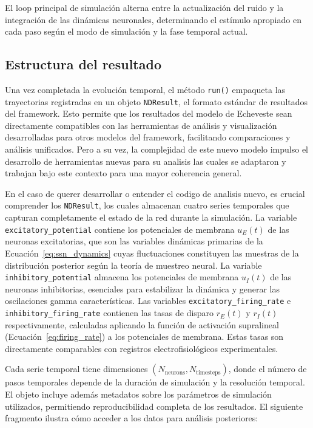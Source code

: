 El loop principal de simulación alterna entre la actualización del ruido y la integración de las dinámicas neuronales, determinando el estímulo apropiado en cada paso según el modo de simulación y la fase temporal actual.

\subsection{Estructura del resultado}
\label{subsec:impl_resultado}

Una vez completada la evolución temporal, el método \texttt{run()} empaqueta las trayectorias registradas en un objeto \texttt{NDResult}, el formato estándar de resultados del framework. Esto permite que los resultados del modelo de Echeveste sean directamente compatibles con las herramientas de análisis y visualización desarrolladas para otros modelos del framework, facilitando comparaciones y análisis unificados. Pero a su vez, la complejidad de este nuevo modelo impulso el desarrollo de herramientas nuevas para su analisis las cuales se adaptaron y trabajan bajo este contexto para una mayor coherencia general.

En el caso de querer desarrollar o entender el codigo de analisis nuevo, es crucial comprender los \texttt{NDResult}, los cuales almacenan cuatro series temporales que capturan completamente el estado de la red durante la simulación. La variable \texttt{excitatory\_potential} contiene los potenciales de membrana $u_E(t)$ de las neuronas excitatorias, que son las variables dinámicas primarias de la Ecuación~\ref{eq:ssn_dynamics} cuyas fluctuaciones constituyen las muestras de la distribución posterior según la teoría de muestreo neural. La variable \texttt{inhibitory\_potential} almacena los potenciales de membrana $u_I(t)$ de las neuronas inhibitorias, esenciales para estabilizar la dinámica y generar las oscilaciones gamma características. Las variables \texttt{excitatory\_firing\_rate} e \texttt{inhibitory\_firing\_rate} contienen las tasas de disparo $r_E(t)$ y $r_I(t)$ respectivamente, calculadas aplicando la función de activación supralineal (Ecuación~\ref{eq:firing_rate}) a los potenciales de membrana. Estas tasas son directamente comparables con registros electrofisiológicos experimentales.

Cada serie temporal tiene dimensiones $(N_{\text{neurons}}, N_{\text{timesteps}})$, donde el número de pasos temporales depende de la duración de simulación y la resolución temporal. El objeto incluye además metadatos sobre los parámetros de simulación utilizados, permitiendo reproducibilidad completa de los resultados. El siguiente fragmento ilustra cómo acceder a los datos para análisis posteriores:

